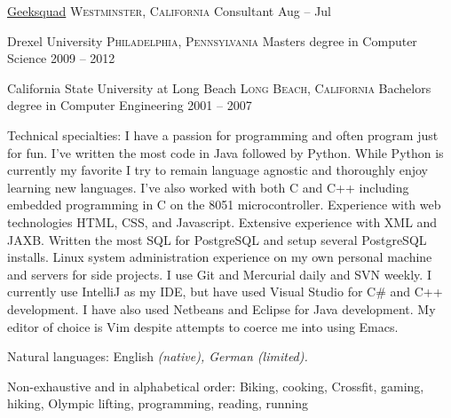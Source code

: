 \documentclass[10pt,a4paper]{article}
\begin{document}
\headedsection
  {\href{http://www.geeksquad.com/}{Geeksquad}}
  {\textsc{Westminster, California}} {%
  \headedsubsection
  { Consultant}
    {Aug -- Jul}
    {}
}



\spacedhrule{-0.2em}{-0.4em}


\headedsection
  {Drexel University}
  {\textsc{Philadelphia, Pennsylvania}} {%
  \headedsubsection
    {Masters degree in Computer Science}
    {2009 -- 2012}
    {}
}

\headedsection
  {California State University at Long Beach}
  {\textsc{Long Beach, California}} {%
  \headedsubsection
    {Bachelors degree in Computer Engineering}
    {2001 -- 2007} 
    {}
}

\spacedhrule{0.5em}{-0.4em}


\inlineheadsection  %
  {Technical specialties:}
  {I have a passion for programming and often program just for fun. I've written the
  most code in Java followed by Python. While Python is currently my favorite
  I try to remain language agnostic and thoroughly enjoy learning new
  languages. I've also worked with both C and C++ including embedded programming
  in C on the 8051 microcontroller. Experience with web 
  technologies {HTML}, {CSS}, and {Javascript}. Extensive experience with
  {XML} and {JAXB}. Written the most {SQL} for {PostgreSQL} and setup several 
  {PostgreSQL} installs. Linux system administration experience on my 
  own personal machine and servers for side projects. I use {Git} and 
  Mercurial daily and {SVN} weekly. I currently
  use IntelliJ as my IDE, but have used Visual Studio for {C\#} and {C++}
  development. I have also used {Netbeans} and {Eclipse} for Java development.
  My editor of choice is Vim despite attempts to coerce me into using Emacs.}

\inlineheadsection
  {Natural languages:}
  {English \emph{(native), German \emph{(limited)}.}}


\spacedhrule{1.6em}{-0.4em}


\inlineheadsection
  {Non-exhaustive and in alphabetical order:}
  {Biking, cooking, Crossfit, gaming, hiking, Olympic lifting, programming, reading, running}
\end{document}
